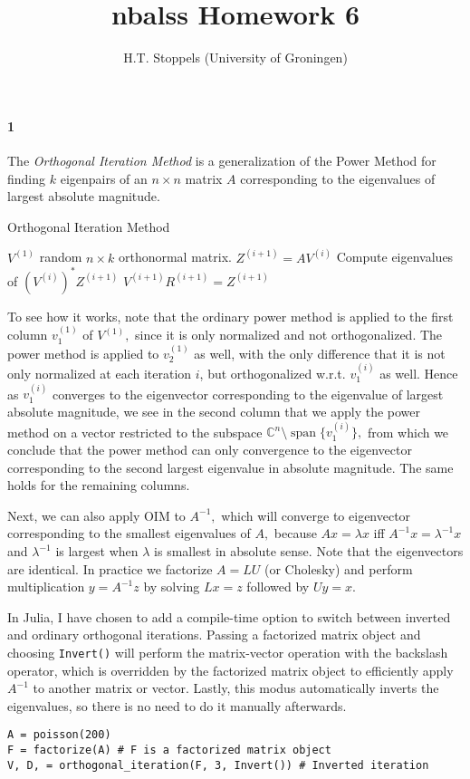 \documentclass[a4paper]{article}
\author{H.T. Stoppels (University of Groningen)}
\title{{\sc nbalss} Homework 6}
\DeclareMathOperator{\sspan}{span}
\begin{document}
  \maketitle 

  \paragraph{1} The \emph{Orthogonal Iteration Method} is a generalization of the Power Method for finding $k$ eigenpairs of an $n \times n$ matrix $A$ corresponding to the eigenvalues of largest absolute magnitude.

  \begin{algorithm}
\caption{Orthogonal Iteration Method}\label{alg:oim}
\begin{algorithmic}[1]
\State $V^{(1)}$ random $n \times k$ orthonormal matrix.
  \State $Z^{(i+1)} = A V^{(i)}$
  \State Compute eigenvalues of $(V^{(i)})^*Z^{(i+1)}$
  \State $V^{(i+1)}R^{(i+1)} = Z^{(i+1)}$  
\EndFor
\EndProcedure
\end{algorithmic}
\end{algorithm}
  To see how it works, note that the ordinary power method is applied to the first column $v_1^{(1)}$ of $V^{(1)},$ since it is only normalized and not orthogonalized. The power method is applied to $v_2^{(1)}$ as well, with the only difference that it is not only normalized at each iteration $i$, but orthogonalized w.r.t. $v_1^{(i)}$ as well. Hence as $v_1^{(i)}$ converges to the eigenvector corresponding to the eigenvalue of largest absolute magnitude, we see in the second column that we apply the power method on a vector restricted to the subspace $\mathbb{C}^n \setminus \sspan\{v_1^{(i)}\},$ from which we conclude that the power method can only convergence to the eigenvector corresponding to the second largest eigenvalue in absolute magnitude. The same holds for the remaining columns.

  Next, we can also apply OIM to $A^{-1},$ which will converge to eigenvector corresponding to the smallest eigenvalues of $A,$ because $Ax = \lambda x$ iff $A^{-1}x = \lambda^{-1}x$ and $\lambda^{-1}$ is largest when $\lambda$ is smallest in absolute sense. Note that the eigenvectors are identical. In practice we factorize $A = LU$ (or Cholesky) and perform multiplication $y = A^{-1}z$ by solving $Lx = z$ followed by $Uy = x.$

  In Julia, I have chosen to add a compile-time option to switch between inverted and ordinary orthogonal iterations. Passing a factorized matrix object and choosing {\tt Invert()} will perform the matrix-vector operation with the backslash operator, which is overridden by the factorized matrix object to efficiently apply $A^{-1}$ to another matrix or vector. Lastly, this modus automatically inverts the eigenvalues, so there is no need to do it manually afterwards.
  \begin{lstlisting}
A = poisson(200)
F = factorize(A) # F is a factorized matrix object
V, D, = orthogonal_iteration(F, 3, Invert()) # Inverted iteration
  \end{lstlisting}
\end{document}
